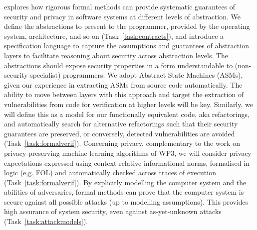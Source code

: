 \begin{Workpackage}{\thewpno}
\begin{WPDescription}
\theWP{} explores how rigorous formal methods can %
provide systematic guarantees of security and privacy in 
software systems at different levels of abstraction.
We define the abstractions to present to the programmer, provided by the operating system, architecture, and so on (Task~\ref{task:contracts}), and introduce a specification language to capture the assumptions and guarantees of abstraction layers to facilitate reasoning about security across abstraction levels.
The abstractions should expose security properties in a form understandable to (non-security specialist) programmers. We adopt Abstract State Machines (ASMs), given our experience in extracting ASMs from source code automatically. 
The ability to move between layers with this approach and target the extraction of vulnerabilities from code for verification at higher levels will be key.
Similarly, we will define this as a model for our functionally equivalent code, aka refactorings, and automatically search for alternative refactorings such that their security guarantees are preserved, or conversely, detected vulnerabilities are avoided (Task~\ref{task:formalverif}).
Concerning privacy, complementary to the work on privacy-preserving machine learning algorithms of WP3, we will consider privacy expectations expressed using context-relative informational norms, formalised in logic (e,g. FOL) and automatically checked across traces of execution (Task~\ref{task:formalverif}).  
By explicitly modelling the computer system and the abilities of adversaries, formal methods can prove that the computer system is secure against all possible attacks (up to modelling assumptions). This provides high assurance of system security, even against as-yet-unknown attacks (Task~\ref{task:attackmodels}).

\end{WPDescription}
\end{Workpackage}
